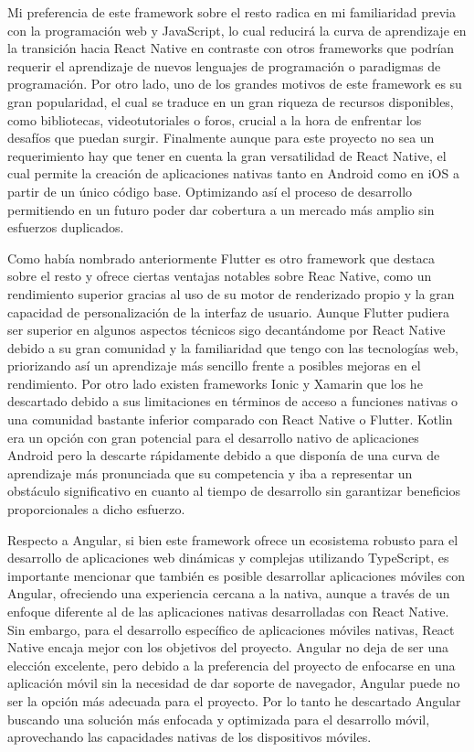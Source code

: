 Mi preferencia de este framework sobre el resto radica en mi familiaridad previa con la programación web y JavaScript, lo cual reducirá la curva de aprendizaje en la transición hacia React Native en contraste con otros frameworks que podrían requerir el aprendizaje de nuevos lenguajes de programación o paradigmas de programación. Por otro lado, uno de los grandes motivos de este framework es su gran popularidad, el cual se traduce en un gran riqueza de recursos disponibles, como bibliotecas, videotutoriales o foros, crucial a la hora de enfrentar los desafíos que puedan surgir. Finalmente aunque para este proyecto no sea un requerimiento hay que tener en cuenta la gran versatilidad de React Native, el cual permite la creación de aplicaciones nativas tanto en Android como en iOS a partir de un único código base. Optimizando así el proceso de desarrollo permitiendo en un futuro poder dar cobertura a un mercado más amplio sin esfuerzos duplicados.

Como había nombrado anteriormente Flutter es otro framework que destaca sobre el resto y ofrece ciertas ventajas notables sobre Reac Native, como un rendimiento superior gracias al uso de su motor de renderizado propio y la gran capacidad de personalización de la interfaz de usuario. Aunque Flutter pudiera ser superior en algunos aspectos técnicos sigo decantándome por React Native debido a su gran comunidad y la familiaridad que tengo con las tecnologías web, priorizando así un aprendizaje más sencillo frente a posibles mejoras en el rendimiento. Por otro lado existen frameworks Ionic y Xamarin que los he descartado debido a sus limitaciones en términos de acceso a funciones nativas o una comunidad bastante inferior comparado con React Native o Flutter. Kotlin era un opción con gran potencial para el desarrollo nativo de aplicaciones Android pero la descarte rápidamente debido a que disponía de una curva de aprendizaje más pronunciada que su competencia y iba a representar un obstáculo significativo en cuanto al tiempo de desarrollo sin garantizar beneficios proporcionales a dicho esfuerzo.

Respecto a Angular, si bien este framework ofrece un ecosistema robusto para el desarrollo de aplicaciones web dinámicas y complejas utilizando TypeScript, es importante mencionar que también es posible desarrollar aplicaciones móviles con Angular, ofreciendo una experiencia cercana a la nativa, aunque a través de un enfoque diferente al de las aplicaciones nativas desarrolladas con React Native. Sin embargo, para el desarrollo específico de aplicaciones móviles nativas, React Native encaja mejor con los objetivos del proyecto.
Angular no deja de ser una elección excelente, pero debido a la preferencia del proyecto de enfocarse en una aplicación móvil sin la necesidad de dar soporte de navegador, Angular puede no ser la opción más adecuada para el proyecto.
Por lo tanto he descartado Angular buscando una solución más enfocada y optimizada para el desarrollo móvil, aprovechando las capacidades nativas de los dispositivos móviles.


